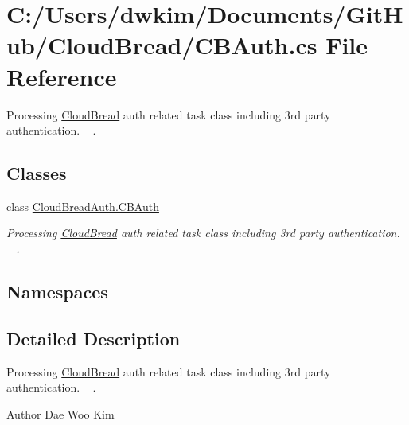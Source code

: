 \hypertarget{a00116}{}\section{C\+:/\+Users/dwkim/\+Documents/\+Git\+Hub/\+Cloud\+Bread/\+C\+B\+Auth.cs File Reference}
\label{a00116}


Processing \hyperlink{a00217}{Cloud\+Bread} auth related task class including 3rd party authentication. ~\newline
.  


\subsection*{Classes}
\begin{DoxyCompactItemize}
\item 
class \hyperlink{a00009}{Cloud\+Bread\+Auth.\+C\+B\+Auth}
\begin{DoxyCompactList}\small\item\em Processing \hyperlink{a00217}{Cloud\+Bread} auth related task class including 3rd party authentication. ~\newline
. \end{DoxyCompactList}\end{DoxyCompactItemize}
\subsection*{Namespaces}
\begin{DoxyCompactItemize}
\end{DoxyCompactItemize}


\subsection{Detailed Description}
Processing \hyperlink{a00217}{Cloud\+Bread} auth related task class including 3rd party authentication. ~\newline
. 

\begin{DoxyAuthor}{Author}
Dae Woo Kim 
\end{DoxyAuthor}
